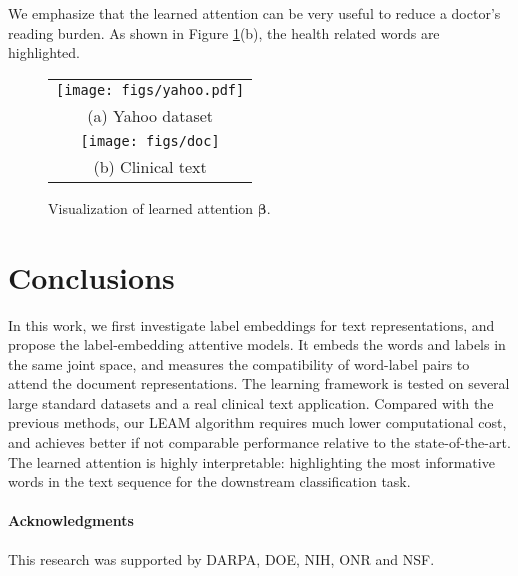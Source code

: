 \documentclass[11pt,a4paper]{article}
\newcommand{\betav}[0]{{\boldsymbol{\beta}}}
\begin{document}
We emphasize that the learned attention can be very useful to reduce a doctor's reading burden. As shown in Figure \ref{fig:attention}(b), the health related words are highlighted.


\begin{figure}[t!] \centering
	\vspace{-0mm}
	\begin{tabular}{c}		
		\hspace{-5mm}
		\texttt{[image: figs/yahoo.pdf]} \\
		(a) Yahoo dataset  \vspace{0mm}  \\
		\hspace{-5mm}
		\texttt{[image: figs/doc]}   \\
		(b) Clinical text  \hspace{-0mm}
	\end{tabular}
	\vspace{-1mm}
	\caption{Visualization of learned attention $\betav$.}
	\vspace{-0mm}
	\label{fig:attention}
\end{figure}


\section{Conclusions}
\label{sec:conclusions}
In this work, we first investigate label embeddings for text representations, 
and propose the label-embedding attentive models. It embeds the words and labels in the same joint space, and measures the compatibility of word-label pairs to attend the document representations.
The learning framework is tested on several large standard datasets and a real clinical text application. Compared with the previous methods, our LEAM algorithm requires much lower computational cost, and achieves better if not comparable performance relative to the state-of-the-art. The learned attention is highly interpretable: highlighting the most informative words in the text sequence for the downstream classification task.

\paragraph{Acknowledgments} This research was supported by DARPA, DOE, NIH, ONR and NSF.



\newpage


\end{document}
